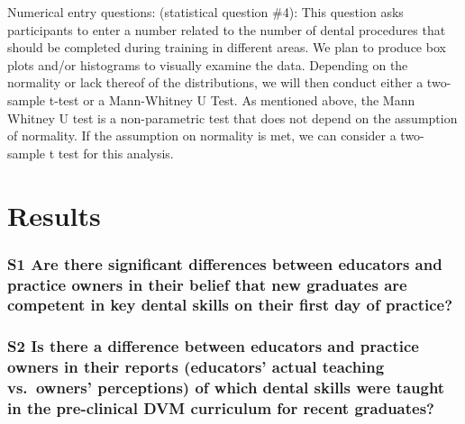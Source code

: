 \documentclass[
  11pt,
  letterpaper,
  DIV=11,
  numbers=noendperiod]{scrartcl}
\begin{document}
Numerical entry questions: (statistical question \#4): This question
asks participants to enter a number related to the number of dental
procedures that should be completed during training in different areas.
We plan to produce box plots and/or histograms to visually examine the
data. Depending on the normality or lack thereof of the distributions,
we will then conduct either a two-sample t-test or a Mann-Whitney U
Test. As mentioned above, the Mann Whitney U test is a non-parametric
test that does not depend on the assumption of normality. If the
assumption on normality is met, we can consider a two-sample t test for
this analysis.

\hypertarget{results}{%
\section{Results}\label{results}}

\hypertarget{s1-are-there-significant-differences-between-educators-and-practice-owners-in-their-belief-that-new-graduates-are-competent-in-key-dental-skills-on-their-first-day-of-practice}{%
\subsubsection{S1 Are there significant differences between educators
and practice owners in their belief that new graduates are competent in
key dental skills on their first day of
practice?}\label{s1-are-there-significant-differences-between-educators-and-practice-owners-in-their-belief-that-new-graduates-are-competent-in-key-dental-skills-on-their-first-day-of-practice}}

\hypertarget{s2-is-there-a-difference-between-educators-and-practice-owners-in-their-reports-educators-actual-teaching-vs.-owners-perceptions-of-which-dental-skills-were-taught-in-the-pre-clinical-dvm-curriculum-for-recent-graduates}{%
\subsubsection{S2 Is there a difference between educators and practice
owners in their reports (educators' actual teaching vs.~owners'
perceptions) of which dental skills were taught in the pre-clinical DVM
curriculum for recent
graduates?}\label{s2-is-there-a-difference-between-educators-and-practice-owners-in-their-reports-educators-actual-teaching-vs.-owners-perceptions-of-which-dental-skills-were-taught-in-the-pre-clinical-dvm-curriculum-for-recent-graduates}}
\end{document}
